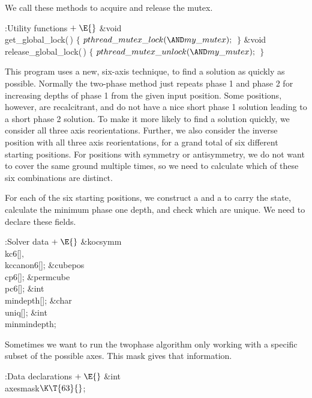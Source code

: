We call these methods to acquire and release the mutex.

\Y\B\4:Utility functions\X${}\mathrel+\E{}$\6
\&{void} \\{get\_global\_lock}(\,)\1\1\2\2\6
${}\{{}$\1\6
${}\\{pthread\_mutex\_lock}({\AND}\\{my\_mutex});{}$\6
\4${}\}{}$\2\7
\&{void} \\{release\_global\_lock}(\,)\1\1\2\2\6
${}\{{}$\1\6
${}\\{pthread\_mutex\_unlock}({\AND}\\{my\_mutex});{}$\6
\4${}\}{}$\2\par
\fi

This program uses a new, six-axis technique, to find a solution as
quickly as possible.  Normally the two-phase method just repeats phase
1 and phase 2 for increasing depths of phase 1 from the given input
position.  Some positions, however, are recalcitrant, and do not have
a nice short phase 1 solution leading to a short phase 2 solution.  To
make it more likely to find a solution quickly, we consider all three
axis reorientations.  Further, we also consider the inverse position
with all three axis reorientations, for a grand total of six different
starting positions.  For positions with symmetry or antisymmetry, we
do not want to cover the same ground multiple times, so we need to
calculate which of these six combinations are distinct.

For each of the six starting positions, we construct a  and a
 to carry the state, calculate the minimum phase one depth,
and check which are unique.  We need to declare these fields.

\Y\B\4:Solver data\X${}\mathrel+\E{}$\6
\&{kocsymm} \\{kc6}[]${},{}$ \\{kccanon6}[];\6
\&{cubepos} \\{cp6}[];\6
\&{permcube} \\{pc6}[];\6
\&{int} \\{mindepth}[];\6
\&{char} \\{uniq}[];\6
\&{int} \\{minmindepth};\par
\fi

Sometimes we want to run the twophase algorithm only working
with a specific subset of the possible axes.  This mask gives
that information.

\Y\B\4:Data declarations\X${}\mathrel+\E{}$\6
\&{int} \\{axesmask}${}\K\T{63}{}$;\par
\fi

